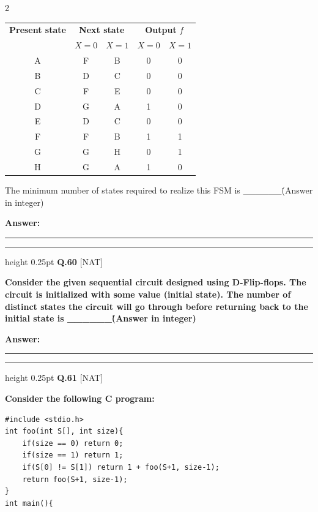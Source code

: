 \documentclass[a4paper,10pt,twoside]{article}
\begin{document}
\begin{multicols}{2}
{\begin{tabular}{|c|cc|cc|}
\hline
\textbf{Present state} & \multicolumn{2}{c|}{\textbf{Next state}} & \multicolumn{2}{c|}{\textbf{Output } $f$} \\
& $X=0$ & $X=1$ & $X=0$ & $X=1$ \\
\hline
A & F & B & 0 & 0 \\
B & D & C & 0 & 0 \\
C & F & E & 0 & 0 \\
D & G & A & 1 & 0 \\
E & D & C & 0 & 0 \\
F & F & B & 1 & 1 \\
G & G & H & 0 & 1 \\
H & G & A & 1 & 0 \\
\hline
\end{tabular}
\par\smallskip
The minimum number of states required to realize this FSM is \_\_\_\_\_\_\. (Answer in integer) \par}
\par\vspace{3pt}\noindent\textbf{Answer:} \rule{3.2cm}{0.4pt}
\par\vspace{6pt}\hrule height 0.25pt\vspace{6pt}
\noindent\textbf{Q.60} \hfill {\footnotesize\textsf{[NAT]}}
\par\vspace{2pt}
{\bfseries Consider the given sequential circuit designed using D-Flip-flops. The circuit is initialized with some value (initial state). The number of distinct states the circuit will go through before returning back to the initial state is \_\_\_\_\_\_\. (Answer in integer) \par}
\par\vspace{3pt}\noindent\textbf{Answer:} \rule{3.2cm}{0.4pt}
\par\vspace{6pt}\hrule height 0.25pt\vspace{6pt}
\noindent\textbf{Q.61} \hfill {\footnotesize\textsf{[NAT]}}
\par\vspace{2pt}
{\bfseries Consider the following C program:
\par\smallskip
\begin{verbatim}
#include <stdio.h>
int foo(int S[], int size){
    if(size == 0) return 0;
    if(size == 1) return 1;
    if(S[0] != S[1]) return 1 + foo(S+1, size-1);
    return foo(S+1, size-1);
}
int main(){

\end{verbatim}}
\end{multicols}
\end{document}
